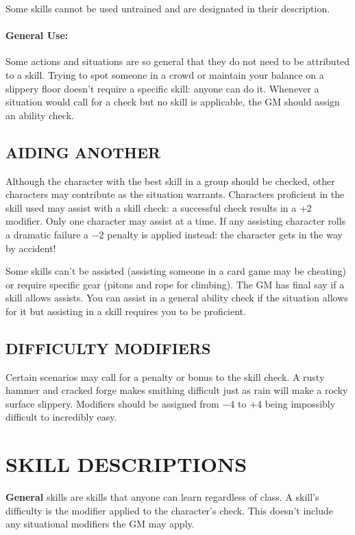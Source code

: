 \begin{multicols}{2}
Some skills cannot be used untrained and are designated in their description.

\paragraph{General Use:} Some actions and situations are so general that they do not need to be attributed to a skill.  Trying to spot someone in a crowd or maintain your balance on a slippery floor doesn't require a specific skill: anyone can do it.  Whenever a situation would call for a check but no skill is applicable, the GM should assign an ability check.  

\subsection{AIDING ANOTHER}

Although the character with the best skill in a group should be checked, other characters may contribute as the situation warrants.  Characters proficient in the skill used may assist with a skill check: a successful check results in a +2 modifier.  Only one character may assist at a time.  If any assisting character rolls a dramatic failure a $-2$ penalty is applied instead: the character gets in the way by accident!  

Some skills can't be assisted (assisting someone in a card game may be cheating) or require specific gear (pitons and rope for climbing).  The GM has final say if a skill allows assists.  You can assist in a general ability check if the situation allows for it but assisting in a skill requires you to be proficient.

\subsection{DIFFICULTY MODIFIERS}

Certain scenarios may call for a penalty or bonus to the skill check.  A rusty hammer and cracked forge makes smithing difficult just as rain will make a rocky surface slippery.  Modifiers should be assigned from $-4$ to +4 being impossibly difficult to incredibly easy.

\section{SKILL DESCRIPTIONS}

\textbf{General} skills are skills that anyone can learn regardless of class.  A skill's difficulty is the modifier applied to the character's check.  This doesn't include any situational modifiers the GM may apply.  


\end{multicols}
